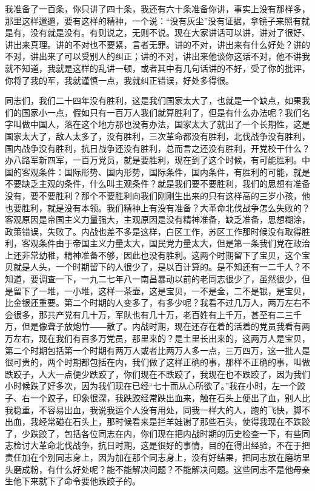 我准备了一百条，你只讲了四十条，我还有六十条准备你讲，事实上没有那样多，那里这样邋遢，要有这样的精神，一个说：“没有灰尘”没有证据，拿镜子来照有就是有，没有就是没有。有则说之，无则不说。现在大家讲话可以讲，讲对了很好、讲出来真理。讲的不对也不要紧，言者无罪。讲的不对，讲出来有什么好处？讲的不对，讲出来了可以受别人的纠正；讲的不对，讲出来他谈你这话不对，他不讲我就不知道，我就是这样的乱讲一顿，或者其中有几句话讲的不好，受了你的批评，你将了我的军，我就谨慎一点，我就纠正错误，好处多得很。

同志们，我们二十四年没有胜利，这是我们国家太大了，也就是一个缺点，如果我们的国家小一点，假如只有一百万人我们就算胜利了，但是有什么办法呢？我们名字叫做中国人，落在这个地方那也没有办法，国家太大了就出了一个长期性，这是国家太大了，敌人太多了，没有胜利，三次革命都没有胜利，北伐战争没有胜利，国内战争没有胜利，抗日战争还没有胜利，总而言之还没有胜利，开党校干什么？办八路军新四军，一百万党员，就是要胜利，现在到了这个时候，有可能胜利。中国的客观条件：国际形势、国内形势，国际条件，国内条件，有胜利的可能，就是不要缺乏主观的条件，什么叫主观条件？就是我们要不要胜利，我们的思想有准备没有，要不要胜利？那个不要胜利向我们刚刚生出来的只有这样高的三岁小孩，他也要胜利，就是没有本领。我们精神上有没有准备？大革命北伐战争怎么失败的？客观原因是帝国主义力量强大，主观原因是没有精神准备，缺乏准备，思想糊涂，政策错误，失败了。内战也差不多是这样，白区工作，苏区工作那时候没有取得胜利，客观条件由于帝国主义力量太大，国民党力量太大，但是第一条我们党在政治上还非常幼稚，精神准备不够，因此也没有胜利。这两个时期留下了宝贝，这个宝贝就是人头，一个时期留下的人很少了，是以百计算的。是不知还有一二千人？不知道，要调查一下，一九二七年八一南昌暴动以前的老同志很少了，虽然很少，但是留下了一堆，一小堆，这样一茶壶，这是宝贝，一不是金，二不是银，是宝贝，比金银还重要。第二个时期的人变多了，有多少呢？我看不过几万人，两万左右不会很多，那共产党有几十万，军队也有几十万，老百姓有上千万，甚至有二三千万，但是像聋子放炮竹――散了。内战时期，现在还存在着的活着的党员我看有两万左右，现在我们有百多万党员，那里来的？是土里长出来的，这两万人是宝贝，第二个时期包括第一个时期有两万人或者比两万人多一点，三万四万，这一批人是很可贵的，两个时期都包括在内，我们做了这样正确的事，那样不正确的事，叫做跌跤子，人大一点便少跌跤了，你们现在不跌跤了，我现在也不跌跤了，因为我们小时候跌了好多次，因为我们现在已经“七十而从心所欲了。”我在小时，左一个跤子、右一个跤子，印象很深，我跌跤经常跌出血来，触在石头上便出了血，别人比我稳重，不容易出血，我说我运个人没有用处，同我一样大的人，跑的飞快，脚不出血，我经常碰在石头上，那时候看来是拦羊娃谢了那些石头，使得我现在不跌跤了，少跌跤了，包括各位同志在内，你们现在把内战时期的历史检查一下，有些同志检讨大革命北伐战争，抗日时期，这是很好的事情，目的在得出经验，不在于把责任加在个别同志身上，因为加在那个同志身上，没有好结果，把同志放在磨坊里头磨成粉，有什么好处呢？能不能解决问题？不能解决问题。这些同志不是他母亲生他下来就下了命令要他跌跤子的。

